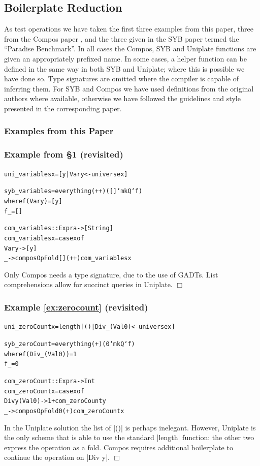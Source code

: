 \documentclass[preprint]{sigplanconf}
\newcommand{\noexample}{\hfill$\Box$}
\newenvironment{code}{\begin{alltt}\small}{\end{alltt}}
\newenvironment{revisit}[1]{\subsubsection*{Example #1 (revisited)}}{\noexample}
\newcommand{\ignore}{}
\begin{document}
\subsection{Boilerplate Reduction}
\label{sec:results_boilerplate}

As test operations we have taken the first three examples from this paper, three from the Compos paper \citep{bringert:compos}, and the three given in the SYB paper \citep{lammel:syb} termed the ``Paradise Benchmark''. In all cases the Compos, SYB and Uniplate functions are given an appropriately prefixed name. In some cases, a helper function can be defined in the same way in both SYB and Uniplate; where this is possible we have done so. Type signatures are omitted where the compiler is capable of inferring them. For SYB and Compos we have used definitions from the original authors where available, otherwise we have followed the guidelines and style presented in the corresponding paper.

\subsubsection{Examples from this Paper}

\subsubsection*{Example from \S1 (revisited)}

\ignore\begin{code}
uni_variables x = [y | Var y <- universe x]

syb_variables = everything (++) ([] `mkQ` f)
    where  f (Var y)  = [y]
           f _        = []

com_variables :: Expr a -> [String]
com_variables x = case x of
    Var y -> [y]
    _ -> composOpFold [] (++) com_variables x
\end{code}

Only Compos needs a type signature, due to the use of GADTs. List comprehensions allow for succinct queries in Uniplate.
\noexample

\begin{revisit}{\ref{ex:zerocount}}

\ignore\begin{code}
uni_zeroCount x = length [() | Div _ (Val 0) <- universe x]

syb_zeroCount = everything (+) (0 `mkQ` f)
    where  f (Div _ (Val 0))  = 1
           f _                = 0

com_zeroCount :: Expr a -> Int
com_zeroCount x = case x of
    Div y (Val 0) -> 1 + com_zeroCount y
    _ -> composOpFold 0 (+) com_zeroCount x
\end{code}

In the Uniplate solution the list of |()| is perhaps inelegant. However, Uniplate is the only scheme that is able to use the standard |length| function: the other two express the operation as a fold. Compos requires additional boilerplate to continue the operation on |Div y|.
\end{revisit}
\end{document}
